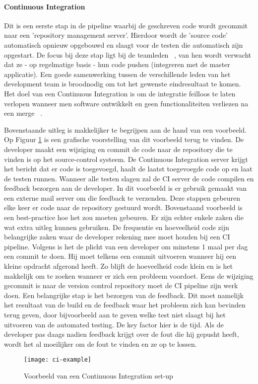 
    \paragraph{Continuous Integration}
    Dit is een eerste stap in de pipeline waarbij de geschreven code wordt gecommit naar een 'repository management server'. Hierdoor wordt de 'source code' automatisch opnieuw opgebouwd en slaagt voor de testen die automatisch zijn opgestart. De focus bij deze stap ligt bij de teamleden ~\autocite{Fowler2006}, van hen wordt verwacht dat ze - op regelmatige basis - hun code pushen (integreren met de master applicatie). Een goede samenwerking tussen de verschillende leden van het development team is broodnodig om tot het gewenste eindresultaat te komen.
    Het doel van een Continuous Integration is om de integratie feilloos te laten verlopen wanneer men software ontwikkelt en geen functionaliteiten verliezen na een merge ~\autocite{Riti2018}.
    
    Bovenstaande uitleg is makkelijker te begrijpen aan de hand van een voorbeeld. Op Figuur \ref{img-ci-example} is een grafische voorstelling van dit voorbeeld terug te vinden.
    De developer maakt een wijziging en commit de code naar de repository die te vinden is op het source-control systeem. De Continuous Integration server krijgt het bericht dat er code is toegevoegd, haalt de laatst toegevoegde code op en laat de testen runnen. Wanneer alle testen slagen zal de CI server de code compilen en feedback bezorgen aan de developer. In dit voorbeeld is er gebruik gemaakt van een externe mail server om die feedback te verzenden.
    Deze stappen gebeuren elke keer er code naar de repository gestuurd wordt.
    Bovenstaand voorbeeld is een best-practice hoe het zou moeten gebeuren. Er zijn echter enkele zaken die wat extra uitleg kunnen gebruiken.
    De frequentie en hoeveelheid code zijn belangrijke zaken waar de developer rekening mee moet houden bij een CI pipeline. Volgens \textcite{Fowler2006} is het de plicht van een developer om minstens 1 maal per dag een commit te doen. Hij moet telkens een commit uitvoeren wanneer hij een kleine opdracht afgerond heeft. Zo blijft de hoeveelheid code klein en is het makkelijk om te zoeken wanneer er zich een probleem voordoet.
    Eens de wijziging gecommit is naar de version control repository moet de CI pipeline zijn werk doen. Een belangrijke stap is het bezorgen van de feedback. Dit moet namelijk het resultaat van de build en de feedback waar het probleem zich kan bevinden terug geven, door bijvoorbeeld aan te geven welke test niet slaagt bij het uitvoeren van de automated testing. De key factor hier is de tijd. Als de developer pas daags nadien feedback krijgt over de fout die hij gepusht heeft, wordt het al moeilijker om de fout te vinden en ze op te lossen. 
    \begin{figure}	
        \texttt{[image: ci-example]}
        \caption{Voorbeeld van een Continuous Integration set-up ~\autocite{Riti2018}} \label{img-ci-example}
    \end{figure}

